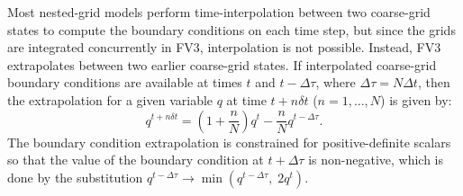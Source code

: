 \documentclass[10pt,letterpaper,margin=1in]{memoir}
\begin{document}
Most nested-grid models perform time-interpolation between two coarse-grid states to compute the boundary conditions on each time step, but since the grids are integrated concurrently in FV3, interpolation is not possible. Instead, FV3 extrapolates between two earlier coarse-grid states. If interpolated coarse-grid boundary conditions are available at times $t$ and $t - \Delta \tau$, where $\Delta \tau = N\Delta t$, then the extrapolation for a given variable $q$ at time $t+n\delta t$ ($n = 1, \ldots, N $) is given by:
\begin{equation}
		 q^{t+n\delta t} = \left ( 1 + \frac{n}{N} \right )q^{t} -   \frac{n}{N}q^{t-\Delta \tau}.
\end{equation}
The boundary condition extrapolation is constrained for positive-definite scalars so that the value of the boundary condition at $t+\Delta \tau$ is non-negative, which is done by the substitution $q^{t-\Delta \tau} \rightarrow \min \left ( q^{t-\Delta \tau}, \; 2q^{t}\right )$.
\end{document}
